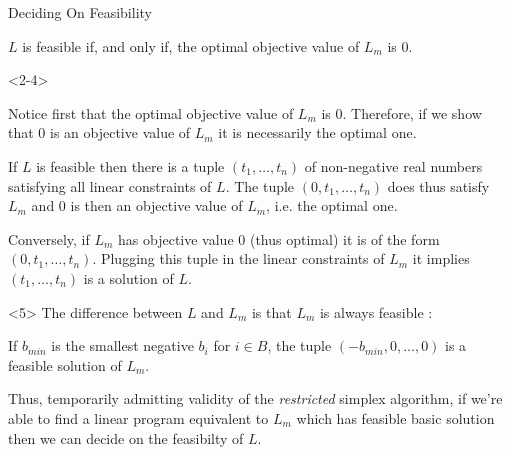 \documentclass[32pt, aspectratio = 169]{beamer}
\begin{document}
\begin{frame}{Deciding On Feasibility}
    \begin{prop}
      $L$ is feasible if, and only if, the optimal objective value of
      $L_{m}$ is $0$.
    \end{prop}
    \begin{overlayarea}{\textwidth}{.8\textheight}
        \vspace{.2\baselineskip}
    \begin{onlyenv}<2-4>
        \setlength\columnseprule{.1pt}
        \begin{multicols}{2}
        \begin{demo}
          Notice first that the optimal objective value of
          $L_{m}$ is $0$. Therefore, if we show that $0$ is an
          objective value of $L_{m}$ it is necessarily the
          optimal one.\pause[3]

          If $L$ is feasible then there is a tuple
          $(t_1, \ldots, t_n)$ of non-negative real numbers satisfying
          all linear constraints of $L$. The tuple
          $(0, t_1, \ldots, t_n)$ does thus satisfy $L_{m}$ and
          $0$ is then an objective value of $L_{m}$, i.e. the
          optimal one.\pause[4]

          Conversely, if $L_{m}$ has objective value $0$ (thus
          optimal) it is of the form $(0, t_1, \ldots, t_n)$. Plugging
          this tuple in the linear constraints of $L_{m}$ it
          implies $(t_1, \ldots, t_n)$ is a solution of $L$.
        \end{demo}
    \end{multicols}
    \end{onlyenv}
    \begin{onlyenv}<5>
    The difference between $L$ and $L_{m}$ is that $L_{m}$ is always feasible :
        \begin{center}
        \begin{minipage}{.7\textwidth}
        \begin{tcolorbox}[
                enhanced,
                parbox = true,
                colback = mLightBrown!30!white,
                colframe = mLightBrown!30!white,
                arc = 0mm,
                ]
                If $b_{min}$ is the smallest negative $b_i$ for
                $i \in B$, the tuple $(-b_{min}, 0, \ldots, 0)$ is a
                feasible solution of $L_{m}$.
        \end{tcolorbox}
        \end{minipage}
        \end{center}
        Thus, temporarily admitting validity of the
        \textit{restricted} simplex algorithm, if we're able to find a
        linear program equivalent to $L_{m}$ which has \alert{feasible
          basic solution} then we can decide on the feasibilty of $L$.
    \end{onlyenv}
    \end{overlayarea}
\end{frame}
\end{document}
